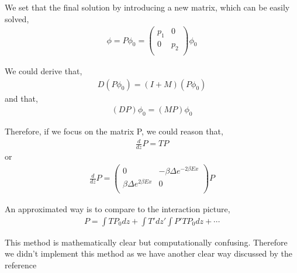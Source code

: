 We set that the final solution by introducing a new matrix,
which can be easily solved,
\begin{eqnarray}
\phi= P\phi_0=
\left(
\begin{array}{cc}
 p_1&0\\
 0&p_2  \\
 
\end{array}\right)\phi_0
\end{eqnarray}

We could derive that,
\begin{eqnarray}
D(P\phi_0)=(I+M)(P\phi_0)
\end{eqnarray}
and that,
\begin{eqnarray}
(DP)\phi_0=(MP)\phi_0
\end{eqnarray}

Therefore, if we focus on the matrix P, we could reason that,
\begin{eqnarray}
\frac{d}{dz}P=TP
\end{eqnarray}
or 
\begin{eqnarray}
\frac{d}{dz}P=
\left(
\begin{array}{cc}
 0& -\beta\Delta e^{-2\beta E x}\\
 \beta\Delta e^{2\beta E x}&0  \\
 
\end{array}\right) P
\end{eqnarray}

An approximated way is to compare to the interaction picture,
\begin{eqnarray}
P=\int TP_0 dz+\int T' dz'\int P'TP_0 dz+\cdots
\end{eqnarray}

This method is mathematically clear but computationally confusing. Therefore we didn't implement this method as we have another clear way discussed by the reference\citep{Reference4}

